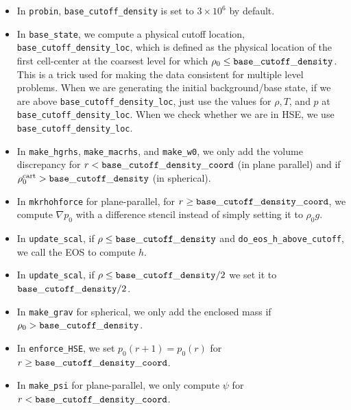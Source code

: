 \begin{itemize}

\item In {\tt probin}, {\tt base\_cutoff\_density} is set to $3\times 10^6$ by default.

\item In {\tt base\_state}, we compute a physical cutoff location,
  {\tt base\_cutoff\_density\_loc}, which is defined as the physical
  location of the first cell-center at the coarsest level for which
  $\rho_0 \le {\tt base\_cutoff\_density}$.  This is a trick used for making
  the data consistent for multiple level problems.  When we are generating the 
  initial background/base state, if we are above {\tt base\_cutoff\_density\_loc}, 
  just use the values for $\rho,T$, and $p$ at {\tt base\_cutoff\_density\_loc}.
  When we check whether we are in HSE, we use {\tt base\_cutoff\_density\_loc}.

\item In {\tt make\_hgrhs}, {\tt make\_macrhs}, and {\tt make\_w0}, 
  we only add the volume discrepancy for $r < {\tt base\_cutoff\_density\_coord}$
  (in plane parallel) and if $\rho_0^{\rm cart} > {\tt base\_cutoff\_density}$ 
  (in spherical).

\item In {\tt mkrhohforce} for plane-parallel, for
  $r \ge {\tt base\_cutoff\_density\_coord}$, we
  compute $\nabla p_0$ with a difference stencil instead of simply
  setting it to $\rho_0 g$.

\item In {\tt update\_scal}, if $\rho \le {\tt base\_cutoff\_density}$
   and {\tt do\_eos\_h\_above\_cutoff}, we call the EOS to compute $h$.

\item In {\tt update\_scal}, if $\rho \le {\tt base\_cutoff\_density}/2$
   we set it to ${\tt base\_cutoff\_density}/2$.

\item In {\tt make\_grav} for spherical, we only add the enclosed mass if
  $\rho_0 > {\tt base\_cutoff\_density}$.

\item In {\tt enforce\_HSE}, we set $p_0(r+1) = p_0(r)$ for 
  $r \ge {\tt base\_cutoff\_density\_coord}$.

\item In {\tt make\_psi} for plane-parallel, we only compute $\psi$ for 
  $r < {\tt base\_cutoff\_density\_coord}$.

\end{itemize}

